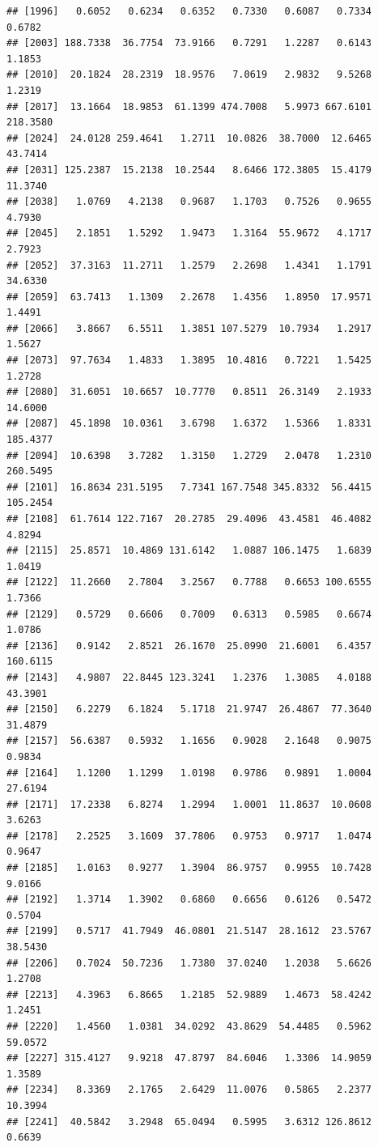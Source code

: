 \documentclass{article}\usepackage[]{graphicx}\usepackage[]{color}
\makeatletter
\newenvironment{kframe}{%
 \def\at@end@of@kframe{}%
 \ifinner\ifhmode%
  \def\at@end@of@kframe{\end{minipage}}%
  \begin{minipage}{\columnwidth}%
 \fi\fi%
 \def\FrameCommand##1{\hskip\@totalleftmargin \hskip-\fboxsep
 \colorbox{shadecolor}{##1}\hskip-\fboxsep
     \hskip-\linewidth \hskip-\@totalleftmargin \hskip\columnwidth}%
 \MakeFramed {\advance\hsize-\width
   \@totalleftmargin\z@ \linewidth\hsize
   \@setminipage}}%
 {\par\unskip\endMakeFramed%
 \at@end@of@kframe}
\newenvironment{knitrout}{}{} %
\makeatother
\begin{document}
\begin{knitrout}
\begin{kframe}
\begin{verbatim}
## [1996]   0.6052   0.6234   0.6352   0.7330   0.6087   0.7334   0.6782
## [2003] 188.7338  36.7754  73.9166   0.7291   1.2287   0.6143   1.1853
## [2010]  20.1824  28.2319  18.9576   7.0619   2.9832   9.5268   1.2319
## [2017]  13.1664  18.9853  61.1399 474.7008   5.9973 667.6101 218.3580
## [2024]  24.0128 259.4641   1.2711  10.0826  38.7000  12.6465  43.7414
## [2031] 125.2387  15.2138  10.2544   8.6466 172.3805  15.4179  11.3740
## [2038]   1.0769   4.2138   0.9687   1.1703   0.7526   0.9655   4.7930
## [2045]   2.1851   1.5292   1.9473   1.3164  55.9672   4.1717   2.7923
## [2052]  37.3163  11.2711   1.2579   2.2698   1.4341   1.1791  34.6330
## [2059]  63.7413   1.1309   2.2678   1.4356   1.8950  17.9571   1.4491
## [2066]   3.8667   6.5511   1.3851 107.5279  10.7934   1.2917   1.5627
## [2073]  97.7634   1.4833   1.3895  10.4816   0.7221   1.5425   1.2728
## [2080]  31.6051  10.6657  10.7770   0.8511  26.3149   2.1933  14.6000
## [2087]  45.1898  10.0361   3.6798   1.6372   1.5366   1.8331 185.4377
## [2094]  10.6398   3.7282   1.3150   1.2729   2.0478   1.2310 260.5495
## [2101]  16.8634 231.5195   7.7341 167.7548 345.8332  56.4415 105.2454
## [2108]  61.7614 122.7167  20.2785  29.4096  43.4581  46.4082   4.8294
## [2115]  25.8571  10.4869 131.6142   1.0887 106.1475   1.6839   1.0419
## [2122]  11.2660   2.7804   3.2567   0.7788   0.6653 100.6555   1.7366
## [2129]   0.5729   0.6606   0.7009   0.6313   0.5985   0.6674   1.0786
## [2136]   0.9142   2.8521  26.1670  25.0990  21.6001   6.4357 160.6115
## [2143]   4.9807  22.8445 123.3241   1.2376   1.3085   4.0188  43.3901
## [2150]   6.2279   6.1824   5.1718  21.9747  26.4867  77.3640  31.4879
## [2157]  56.6387   0.5932   1.1656   0.9028   2.1648   0.9075   0.9834
## [2164]   1.1200   1.1299   1.0198   0.9786   0.9891   1.0004  27.6194
## [2171]  17.2338   6.8274   1.2994   1.0001  11.8637  10.0608   3.6263
## [2178]   2.2525   3.1609  37.7806   0.9753   0.9717   1.0474   0.9647
## [2185]   1.0163   0.9277   1.3904  86.9757   0.9955  10.7428   9.0166
## [2192]   1.3714   1.3902   0.6860   0.6656   0.6126   0.5472   0.5704
## [2199]   0.5717  41.7949  46.0801  21.5147  28.1612  23.5767  38.5430
## [2206]   0.7024  50.7236   1.7380  37.0240   1.2038   5.6626   1.2708
## [2213]   4.3963   6.8665   1.2185  52.9889   1.4673  58.4242   1.2451
## [2220]   1.4560   1.0381  34.0292  43.8629  54.4485   0.5962  59.0572
## [2227] 315.4127   9.9218  47.8797  84.6046   1.3306  14.9059   1.3589
## [2234]   8.3369   2.1765   2.6429  11.0076   0.5865   2.2377  10.3994
## [2241]  40.5842   3.2948  65.0494   0.5995   3.6312 126.8612   0.6639

\end{verbatim}
\end{kframe}
\end{knitrout}
\end{document}
